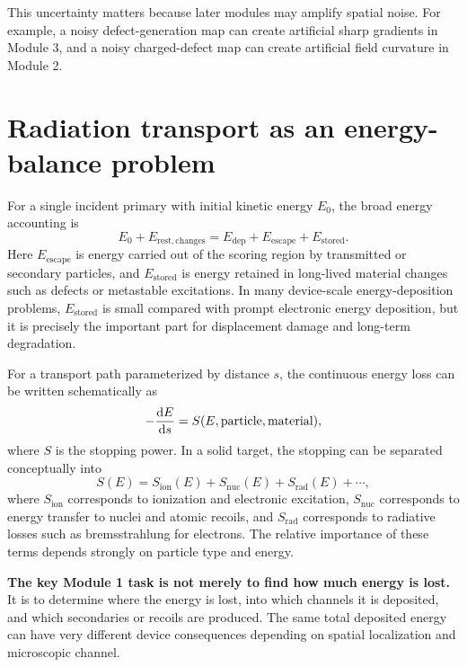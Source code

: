 \documentclass[11pt]{article}
\begin{document}
This uncertainty matters because later modules may amplify spatial noise. For example, a noisy defect-generation map can create artificial sharp gradients in Module 3, and a noisy charged-defect map can create artificial field curvature in Module 2.

\section{Radiation transport as an energy-balance problem}

For a single incident primary with initial kinetic energy $E_0$, the broad energy accounting is
\begin{equation}
E_0 + E_{\mathrm{rest,changes}}
=
E_{\mathrm{dep}} + E_{\mathrm{escape}} + E_{\mathrm{stored}}.
\label{eq:energy_accounting_single_event}
\end{equation}
Here $E_{\mathrm{escape}}$ is energy carried out of the scoring region by transmitted or secondary particles, and $E_{\mathrm{stored}}$ is energy retained in long-lived material changes such as defects or metastable excitations. In many device-scale energy-deposition problems, $E_{\mathrm{stored}}$ is small compared with prompt electronic energy deposition, but it is precisely the important part for displacement damage and long-term degradation.

For a transport path parameterized by distance $s$, the continuous energy loss can be written schematically as
\begin{equation}
-\dv{E}{s} = S(E,\text{particle},\text{material}),
\label{eq:stopping_power_general}
\end{equation}
where $S$ is the stopping power. In a solid target, the stopping can be separated conceptually into
\begin{equation}
S(E) = S_{\mathrm{ion}}(E) + S_{\mathrm{nuc}}(E) + S_{\mathrm{rad}}(E)+\cdots,
\label{eq:stopping_partition}
\end{equation}
where $S_{\mathrm{ion}}$ corresponds to ionization and electronic excitation, $S_{\mathrm{nuc}}$ corresponds to energy transfer to nuclei and atomic recoils, and $S_{\mathrm{rad}}$ corresponds to radiative losses such as bremsstrahlung for electrons. The relative importance of these terms depends strongly on particle type and energy.

\begin{physicsbox}
\textbf{The key Module 1 task is not merely to find how much energy is lost.} It is to determine where the energy is lost, into which channels it is deposited, and which secondaries or recoils are produced. The same total deposited energy can have very different device consequences depending on spatial localization and microscopic channel.
\end{physicsbox}
\end{document}
